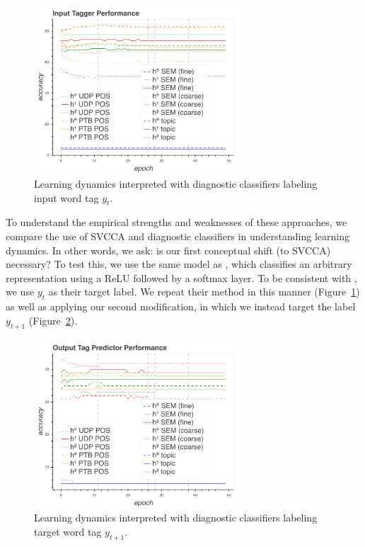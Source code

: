 \begin{figure}
\includegraphics[width=0.7\textwidth]{svcca/input_belinkov.png}\centering
\caption{Learning dynamics interpreted with diagnostic classifiers labeling input word tag $y_{t}$.}
\label{fig:belinkov_input}
\end{figure}

To understand the empirical strengths and weaknesses of these approaches, we compare the use of SVCCA and diagnostic classifiers in understanding learning dynamics. In other words, we ask: is our first conceptual shift (to SVCCA) necessary? To test this, we use the same model as \citeauthor{belinkov_what_2017}, which classifies an arbitrary representation using a ReLU followed by a softmax layer. To be consistent with \citeauthor{belinkov_what_2017}, we use $y_t$ as their target label. We repeat their method in this manner (Figure~\ref{fig:belinkov_input}) as well as applying our second modification, in which we instead target the label $y_{t+1}$ (Figure~\ref{fig:belinkov}).

\begin{figure}
\includegraphics[width=0.7\textwidth]{svcca/belinkov_out.png}\centering
\caption{Learning dynamics interpreted with diagnostic classifiers labeling target word tag $y_{t+1}$.}
\label{fig:belinkov}
\end{figure}

